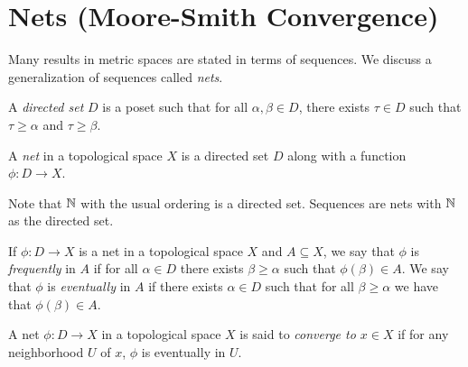 \documentclass[letterpaper, 11pt, oneside]{book}
\begin{document}
\clearpage

\chapter{Nets (Moore-Smith Convergence)}

Many results in metric spaces are stated in terms of sequences.
We discuss a generalization of sequences called \emph{nets}.

\begin{defn}
  A \emph{directed set} $D$ is a poset such that for all $\alpha, \beta \in D$, there exists $\tau \in D$ such that $\tau \geq \alpha$ and $\tau \geq \beta$.
\end{defn}

\begin{defn}[Net]
  A \emph{net} in a topological space $X$ is a directed set $D$ along with a function $\phi\colon D \to X$.
\end{defn}

\begin{ex}
  Note that $\mathbb{N}$ with the usual ordering is a directed set.
  Sequences are nets with $\mathbb{N}$ as the directed set.
\end{ex}

\begin{defn}
  If $\phi\colon D \to X$ is a net in a topological space $X$ and $A \subseteq X$, we say that $\phi$ is \emph{frequently} in $A$ if for all $\alpha \in D$ there exists $\beta \geq \alpha$ such that $\phi(\beta) \in A$.
  We say that $\phi$ is \emph{eventually} in $A$ if there exists $\alpha \in D$ such that for all $\beta \geq \alpha$ we have that $\phi(\beta) \in A$.
\end{defn}

\begin{defn}
  A net $\phi\colon D \to X$ in a topological space $X$ is said to \emph{converge to $x \in X$} if for any neighborhood $U$ of $x$, $\phi$ is eventually in $U$.
\end{defn}

\clearpage
\end{document}
